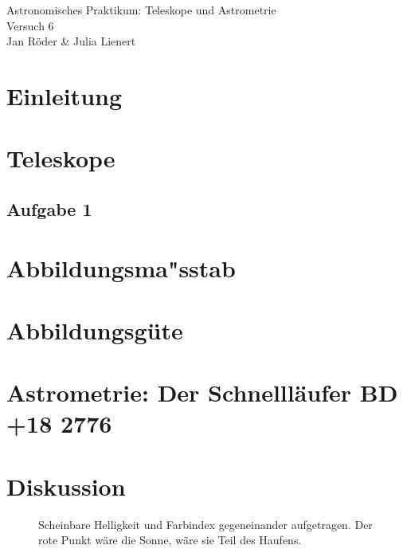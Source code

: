 \documentclass[12pt]{article}
\begin{document}
	\pagestyle{empty}
	

\begin{titlepage}
	\centering
	\bigskip
	\huge{Astronomisches Praktikum: Teleskope und Astrometrie}\\
	\bigskip
	\large{Versuch 6}\\
	\bigskip
	\large{Jan R\"{o}der \& Julia Lienert}
	\bigskip
	\tableofcontents
\end{titlepage}

\pagebreak


\section{Einleitung}



\section{Teleskope}

\subsection{Aufgabe 1}














\section{Abbildungsma"sstab}
\section{Abbildungsg\"{u}te}
\section{Astrometrie: Der Schnelll\"{a}ufer BD +18$\mathring{}$ 2776}




\pagebreak

\section{Diskussion}




\begin{figure} [h]
	\centering
	\caption{Scheinbare Helligkeit und Farbindex gegeneinander aufgetragen. Der rote Punkt w\"{a}re die Sonne, w\"{a}re sie Teil des Haufens.}
	\label{fig:hrd_unknown}
\end{figure}
\end{document}
